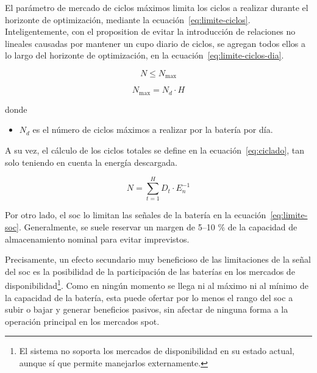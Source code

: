 El parámetro de mercado de ciclos máximos limita los ciclos a realizar durante el horizonte de optimización, mediante la ecuación~\ref{eq:limite-ciclos}. Inteligentemente, con el proposition de evitar la introducción de relaciones no lineales causadas por mantener un cupo diario de ciclos, se agregan todos ellos a lo largo del horizonte de optimización, en la ecuación~\ref{eq:limite-ciclos-dia}.

\begin{equation}%
  \label{eq:limite-ciclos}
  N \le N_{\text{max}}
\end{equation}

\begin{samepage}

  \begin{equation}%
    \label{eq:limite-ciclos-dia}
    N_{\text{max}} = N_{d} \cdot H
  \end{equation}

  donde

  \begin{itemize}

    \item \( N_{d} \) es el número de ciclos máximos a realizar por la batería por día.

  \end{itemize}

\end{samepage}

A su vez, el cálculo de los ciclos totales se define en la ecuación~\ref{eq:ciclado}, tan solo teniendo en cuenta la energía descargada.

\begin{equation}%
  \label{eq:ciclado}
  N = \sum_{t = 1}^{H} D_{t} \cdot E_{n}^{-1}
\end{equation}

Por otro lado, el \gls{soc} lo limitan las señales de la batería en la ecuación~\ref{eq:limite-soc}. Generalmente, se suele reservar un margen de 5--10 \% de la capacidad de almacenamiento nominal para evitar imprevistos.

Precisamente, un efecto secundario muy beneficioso de las limitaciones de la señal del \gls{soc} es la posibilidad de la participación de las baterías en los mercados de disponibilidad\footnote{El sistema no soporta los mercados de disponibilidad en su estado actual, aunque sí que permite manejarlos externamente.}. Como en ningún momento se llega ni al máximo ni al mínimo de la capacidad de la batería, esta puede ofertar por lo menos el rango del \gls{soc} a subir o bajar y generar beneficios pasivos, sin afectar de ninguna forma a la operación principal en los mercados spot.

